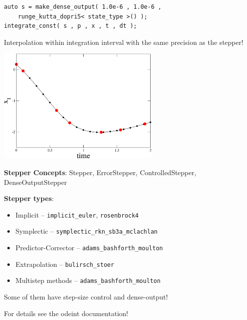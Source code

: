 \begin{frame}[fragile]


\vspace{2ex}

\begin{lstlisting}
auto s = make_dense_output( 1.0e-6 , 1.0e-6 ,
    runge_kutta_dopri5< state_type >() );
integrate_const( s , p , x , t , dt );
\end{lstlisting}

Interpolation within integration interval with the same precision as the stepper!

\vspace{2ex}

\centerline{\includegraphics[draft=false,width=0.6\textwidth]{vdp_dense_output.pdf}}

\end{frame}







\begin{frame}

 \vspace{2ex}

 {\bf Stepper Concepts}: Stepper, ErrorStepper, ControlledStepper, DenseOutputStepper

 \vspace{2ex}

 {\bf Stepper types}: 
 \begin{itemize}
  \item Implicit -- {\tt implicit\_euler}, {\tt rosenbrock4}
  \item Symplectic -- {\tt symplectic\_rkn\_sb3a\_mclachlan}
  \item Predictor-Corrector -- {\tt adams\_bashforth\_moulton}
  \item Extrapolation -- {\tt bulirsch\_stoer}
  \item Multistep methods -- {\tt adams\_bashforth\_moulton}
 \end{itemize}

 \vspace{2ex}
 Some of them have step-size control and dense-output!

 \vspace{2ex}

 For details see the odeint documentation!

\end{frame}





